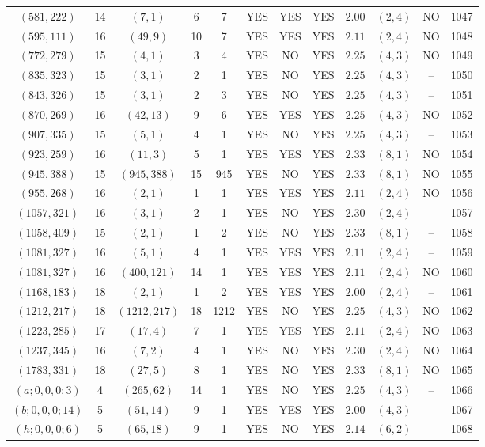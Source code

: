 \begin{longtable}{|c|c|c|c|c|c|c|c|c|c|c|c|}
$(581,222)$ & 14 & $(7,1)$ & 6 & 7 & YES & YES & YES & $2.00$ & $(2,4)$ & NO & 1047\\
$(595,111)$ & 16 & $(49,9)$ & 10 & 7 & YES & YES & YES & $2.11$ & $(2,4)$ & NO & 1048\\
$(772,279)$ & 15 & $(4,1)$ & 3 & 4 & YES & NO & YES & $2.25$ & $(4,3)$ & NO & 1049\\
$(835,323)$ & 15 & $(3,1)$ & 2 & 1 & YES & NO & YES & $2.25$ & $(4,3)$ & -- & 1050\\
$(843,326)$ & 15 & $(3,1)$ & 2 & 3 & YES & NO & YES & $2.25$ & $(4,3)$ & -- & 1051\\
$(870,269)$ & 16 & $(42,13)$ & 9 & 6 & YES & YES & YES & $2.25$ & $(4,3)$ & NO & 1052\\
$(907,335)$ & 15 & $(5,1)$ & 4 & 1 & YES & NO & YES & $2.25$ & $(4,3)$ & -- & 1053\\
$(923,259)$ & 16 & $(11,3)$ & 5 & 1 & YES & YES & YES & $2.33$ & $(8,1)$ & NO & 1054\\
$(945,388)$ & 15 & $(945,388)$ & 15 & 945 & YES & NO & YES & $2.33$ & $(8,1)$ & NO & 1055\\
$(955,268)$ & 16 & $(2,1)$ & 1 & 1 & YES & YES & YES & $2.11$ & $(2,4)$ & NO & 1056\\
$(1057,321)$ & 16 & $(3,1)$ & 2 & 1 & YES & NO & YES & $2.30$ & $(2,4)$ & -- & 1057\\
$(1058,409)$ & 15 & $(2,1)$ & 1 & 2 & YES & NO & YES & $2.33$ & $(8,1)$ & -- & 1058\\
$(1081,327)$ & 16 & $(5,1)$ & 4 & 1 & YES & YES & YES & $2.11$ & $(2,4)$ & -- & 1059\\
$(1081,327)$ & 16 & $(400,121)$ & 14 & 1 & YES & YES & YES & $2.11$ & $(2,4)$ & NO & 1060\\
$(1168,183)$ & 18 & $(2,1)$ & 1 & 2 & YES & YES & YES & $2.00$ & $(2,4)$ & -- & 1061\\
$(1212,217)$ & 18 & $(1212,217)$ & 18 & 1212 & YES & NO & YES & $2.25$ & $(4,3)$ & NO & 1062\\
$(1223,285)$ & 17 & $(17,4)$ & 7 & 1 & YES & YES & YES & $2.11$ & $(2,4)$ & NO & 1063\\
$(1237,345)$ & 16 & $(7,2)$ & 4 & 1 & YES & NO & YES & $2.30$ & $(2,4)$ & NO & 1064\\
$(1783,331)$ & 18 & $(27,5)$ & 8 & 1 & YES & NO & YES & $2.33$ & $(8,1)$ & NO & 1065\\
$(a;0,0,0;3)$ & 4 & $(265,62)$ & 14 & 1 & YES & NO & YES & $2.25$ & $(4,3)$ & -- & 1066\\
$(b;0,0,0;14)$ & 5 & $(51,14)$ & 9 & 1 & YES & YES & YES & $2.00$ & $(4,3)$ & -- & 1067\\
$(h;0,0,0;6)$ & 5 & $(65,18)$ & 9 & 1 & YES & NO & YES & $2.14$ & $(6,2)$ & -- & 1068
\end{longtable}

